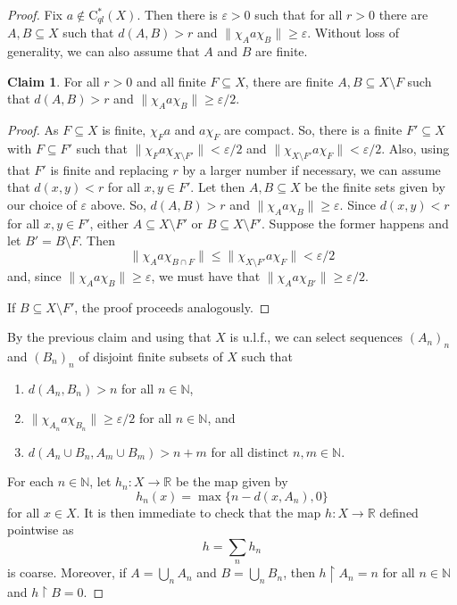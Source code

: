 \documentclass[11pt]{amsart}
\newcommand{\R}{\mathbb{R}}
\newcommand{\N}{\mathbb{N}}
\newcommand{\eps}{\varepsilon}
\newcommand{\cstql}{\mathrm{C}^*_{\textit{ql}}}
\numberwithin{equation}{section}
\theoremstyle{definition}
\newtheorem{claim}[theorem]{Claim}
\theoremstyle{remark}
\begin{document}
\begin{proof}
    Fix $a\not\in \cstql(X)$. Then there is $\eps>0$ such that for all $r>0$ there are $A,B\subseteq X$ such that $d(A,B)>r$ and $\|\chi_Aa\chi_B\|\geq \eps$.
    Without loss of generality, we can also assume that $A$ and $B$ are finite.

\begin{claim}
    For all $r>0$ and all finite $F\subseteq X$, there are finite $A,B\subseteq X\setminus F$ such that $d(A,B)>r$ and $\|\chi_Aa\chi_B\|\geq \eps/2$.
\end{claim}

\begin{proof}
    As $F\subseteq X$ is finite,
     $\chi_Fa$ and $a\chi_F$ are compact. So, there is a finite $F'\subseteq X$ with $F\subseteq F'$ such that $\|\chi_Fa\chi_{X\setminus F'}\|<\eps/2$ and
   $\|\chi_{X\setminus F'}a\chi_{F}\|<\eps/2$.  Also, using that $F'$ is finite   and replacing $r$ by a larger number if necessary, we can assume that $d(x,y)<r$ for all $x,y\in F'$.  Let then $A,B\subseteq X $ be the finite sets given by our choice of $\eps$ above. So, $d(A,B)>r$ and $\|\chi_Aa\chi_B\|\geq \eps$. Since $d(x,y)<r$ for all $x,y\in F'$, either $A\subseteq X\setminus F'$ or $B\subseteq X\setminus F'$. Suppose the former happens and let $B'=B\setminus F$. Then \[\|\chi_{A}a\chi_{B\cap F}\|\leq \|\chi_{X\setminus F'}a\chi_{F}\|<\eps/2\]
   and, since $\|\chi_Aa\chi_B\|\geq \eps$,  we must have that $\|\chi_Aa\chi_{B'}\|\geq \eps/2$.

   If $B\subseteq X\setminus F'$, the proof proceeds analogously.
\end{proof}

By the previous claim and using that $X$ is u.l.f., we can select sequences $(A_n)_n$ and $(B_n)_n$ of disjoint finite subsets of $X$ such that \begin{enumerate}
    \item $d(A_n,B_n)>n$ for all $n\in\N$,
    \item $\|\chi_{A_n}a\chi_{B_n}\|\geq \eps/2$ for all $n\in\N$, and
    \item $d(A_{n}\cup B_n,A_{m}\cup B_m)> n+m$ for all distinct $n,m\in\N$.
\end{enumerate}
For each $n\in\N$, let $h_n\colon X\to \R$ be the map given by
\[h_n(x)=\max\{n-d(x,A_n),0\}\]
    for all $x\in X$. It is then immediate to check that the map $h\colon X\to \R$ defined pointwise as
    \[h=\sum_{n}h_n\]
    is coarse.
    Moreover, if $A=\bigcup_nA_n$ and $B=\bigcup_nB_n$, then $h\restriction A_n=n$ for all $n\in\N$ and $h\restriction B=0$.


\end{proof}
\end{document}
